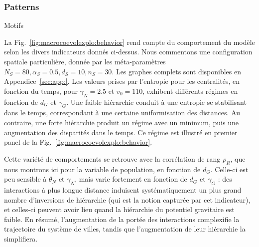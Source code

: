 \subsubsection{Patterns}{Motifs}


La Fig.~\ref{fig:macrocoevolexplo:behavior} rend compte du comportement du modèle selon les divers indicateurs donnés ci-dessus. Nous commentons une configuration spatiale particulière, donnée par les méta-paramètres $N_S=80,\alpha_S=0.5,d_S=10,n_S=30$. Les graphes complets sont disponibles en Appendice~\ref{sec:app:}. Les valeurs prises par l'entropie pour les centralités, en fonction du temps, pour $\gamma_N = 2.5$ et $v_0 = 110$, exhibent différents régimes en fonction de $d_G$ et $\gamma_G$. Une faible hiérarchie conduit à une entropie se stabilisant dans le temps, correspondant à une certaine uniformisation des distances. Au contraire, une forte hiérarchie produit un régime avec un minimum, puis une augmentation des disparités dans le temps. Ce régime est illustré en premier panel de la Fig.~\ref{fig:macrocoevolexplo:behavior}.


Cette variété de comportements se retrouve avec la corrélation de rang $\rho_R$, que nous montrons ici pour la variable de population, en fonction de $d_G$. Celle-ci est peu sensible à $\theta_N$ et $\gamma_N$, mais varie fortement en fonction de $d_G$ et $\gamma_G$ : des interactions à plus longue distance induisent systématiquement un plus grand nombre d'inversions de hiérarchie (qui est la notion capturée par cet indicateur), et celles-ci peuvent avoir lieu quand la hiérarchie du potentiel gravitaire est faible. En résumé, l'augmentation de la portée des interactions complexifie la trajectoire du système de villes, tandis que l'augmentation de leur hiérarchie la simplifiera.




